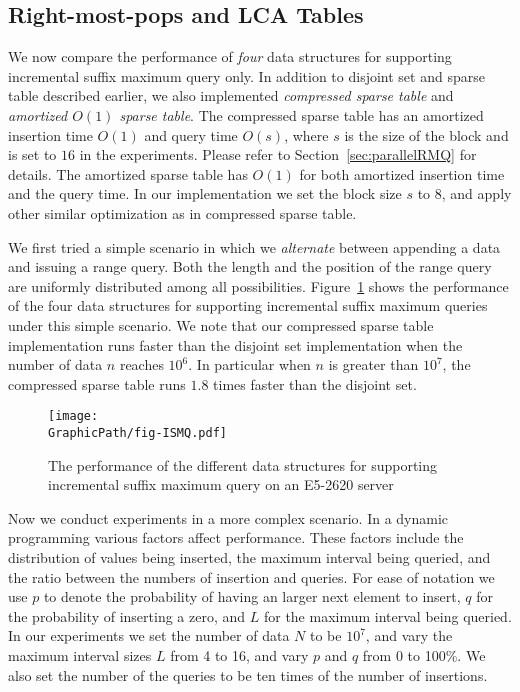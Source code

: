 



\subsection{Right-most-pops and LCA Tables}

We now compare the performance of {\em four} data structures for
supporting incremental suffix maximum query only.  In addition to
disjoint set and sparse table described earlier, we also implemented
{\em compressed sparse table} and {\em amortized $O(1)$ sparse table}.
The compressed sparse table has an amortized insertion time $O(1)$ and
query time $O(s)$, where $s$ is the size of the block and is set to
$16$ in the experiments.  Please refer to
Section~\ref{sec:parallelRMQ} for details.  The amortized sparse table
has $O(1)$ for both amortized insertion time and the query time.  In
our implementation we set the block size $s$ to $8$, and apply other
similar optimization as in compressed sparse table.

We first tried a simple scenario in which we {\em alternate} between
appending a data and issuing a range query.  Both the length and the
position of the range query are uniformly distributed among all
possibilities.  Figure~\ref{fig:fig-ISMQcmp} shows the performance of
the four data structures for supporting incremental suffix maximum
queries under this simple scenario.  We note that our compressed sparse
table implementation runs faster than the disjoint set implementation
when the number of data $n$ reaches $10^6$.  In particular when $n$ is
greater than $10^7$, the compressed sparse table runs $1.8$ times faster
than the disjoint set.

\begin{figure}[!thb]
  \centering
  \texttt{[image: \\GraphicPath/fig-ISMQ.pdf]}
  \caption{The performance of the different data structures for
    supporting incremental suffix maximum query on an E5-2620 server}
  \label{fig:fig-ISMQcmp}
\end{figure}

Now we conduct experiments in a more complex scenario.  In a dynamic
programming various factors affect performance.  These factors include
the distribution of values being inserted, the maximum interval being
queried, and the ratio between the numbers of insertion and queries.
For ease of notation we use $p$ to denote the probability of having an
larger next element to insert, $q$ for the probability of inserting a
zero, and $L$ for the maximum interval being queried.  In our
experiments we set the number of data $N$ to be $10^7$, and vary the
maximum interval sizes $L$ from 4 to 16, and vary $p$ and $q$ from 0
to 100\%.  We also set the number of the queries to be ten times of
the number of insertions.


